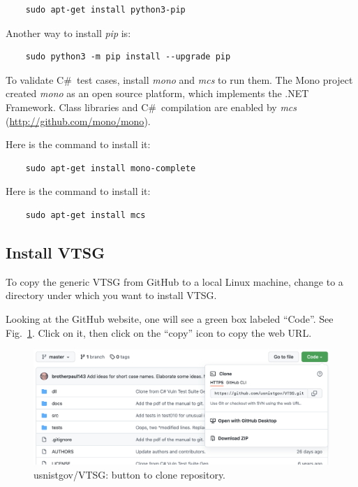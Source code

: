 \documentclass[12pt]{article}
\newcommand{\CSharp}{C{\fontseries{b}\selectfont\#}}
\begin{document}
\begin{verbatim}
    sudo apt-get install python3-pip
\end{verbatim}

\noindent Another way to install \emph{pip} is:

\begin{verbatim}
    sudo python3 -m pip install --upgrade pip
\end{verbatim}

\noindent To validate \CSharp\ test cases, install \emph{mono} and \emph{mcs}
to run them. The Mono project created \emph{mono} as an open source
platform, which
implements the .NET Framework. Class libraries and \CSharp\ compilation are enabled
by \emph{mcs} (\href{http://github.com/mono/mono}{http://github.com/mono/mono}).

\noindent Here is the command to install it:

\begin{verbatim}
    sudo apt-get install mono-complete
\end{verbatim}

\noindent Here is the command to install it:

\begin{verbatim}
    sudo apt-get install mcs
\end{verbatim}

\subsection{Install VTSG}

\noindent To copy the generic VTSG from GitHub to a local Linux machine, change to a
directory under which you want to install VTSG.

\noindent Looking at the GitHub website, one will see a green box labeled ``Code''.
See Fig.~\ref{fig:clone button}.
Click on it, then click on the ``copy'' icon to copy the web URL.

\begin{figure}[htbp]
  \includegraphics[width=1\linewidth]{fig_clone_tab.png}
  \caption{usnistgov/VTSG: button to clone repository.}
  \label{fig:clone button}
\end{figure}
\end{document}
